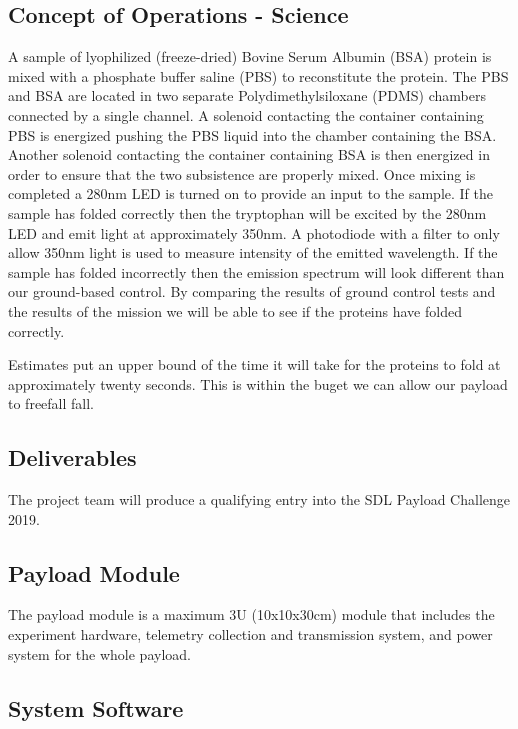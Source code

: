 \documentclass[conference]{IEEEtran} %
\begin{document}
\subsection{Concept of Operations - Science}
\label{subsec:operations}
A sample of lyophilized (freeze-dried) Bovine Serum Albumin (BSA) protein is mixed with a phosphate buffer saline (PBS) to reconstitute the protein. The PBS and BSA are located in two separate Polydimethylsiloxane (PDMS) chambers connected by a single channel. A solenoid contacting the container containing PBS is energized pushing the PBS liquid into the chamber containing the BSA. Another solenoid contacting the container containing BSA is then energized in order to ensure that the two subsistence are properly mixed. Once mixing is completed a 280nm LED is turned on to provide an input to the sample. If the sample has folded correctly then the tryptophan will be excited by the 280nm LED and emit light at approximately 350nm. A photodiode with a filter to only allow 350nm light is used to measure intensity of the emitted wavelength. If the sample has folded incorrectly then the emission spectrum will look different than our ground-based control. By comparing the results of ground control tests and the results of the mission we will be able to see if the proteins have folded correctly.

Estimates put an upper bound of the time it will take for the proteins to fold at approximately twenty seconds. This is within the buget we can allow our payload to freefall fall. 

\subsection{Deliverables}
\label{subsec:deliverables}
The project team will produce a qualifying entry into the SDL Payload Challenge 2019. 

\subsection{Payload Module}
\label{subsec:payload}
The payload module is a maximum 3U (10x10x30cm) module that includes the experiment hardware, telemetry collection and transmission system, and power system for the whole payload.

\subsection{System Software}
\label{subsec:sysware}
\end{document}
